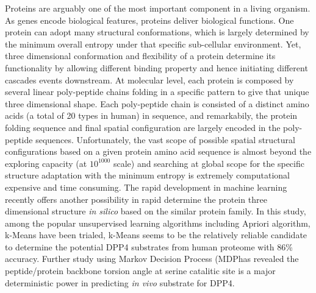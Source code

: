 Proteins are arguably one of the most important component in a living organism. As genes encode biological features, proteins deliver biological functions. One protein can adopt many structural conformations, which is largely determined by the minimum overall entropy under that specific sub-cellular environment. Yet, three dimensional conformation and flexibility of a protein determine its functionality by allowing different binding property and hence initiating different cascades events downstream. At molecular level, each protein is composed by several linear poly-peptide chains folding in a specific pattern to give that unique three dimensional shape. Each poly-peptide chain is consisted of a distinct amino acids (a total of 20 types in human) in sequence, and remarkabily, the protein folding sequence and final spatial configuration are largely encoded in the poly-peptide sequences. Unfortunately, the vast scope of possible spatial structural configurations based on a given protein amino acid sequence is almost beyond the exploring capacity (at $10^{1000}$ scale) and searching at global scope for the specific structure adaptation with the minimum entropy is extremely computational expensive and time consuming. The rapid development in machine learning recently offers another possibility in rapid determine the protein three dimensional structure \textit{in silico} based on the similar protein family. In this study, among the popular unsupervised learning algorithms including Apriori algorithm, k-Means have been trialed, k-Means seems to be the relatively reliable candidate to determine the potential DPP4 substrates from human proteome with 86\% accuracy. Further study using Markov Decision Process (MDPhas revealed the peptide/protein backbone torsion angle at serine catalitic site is a major deterministic power in predicting \textit{in vivo} substrate for DPP4. 